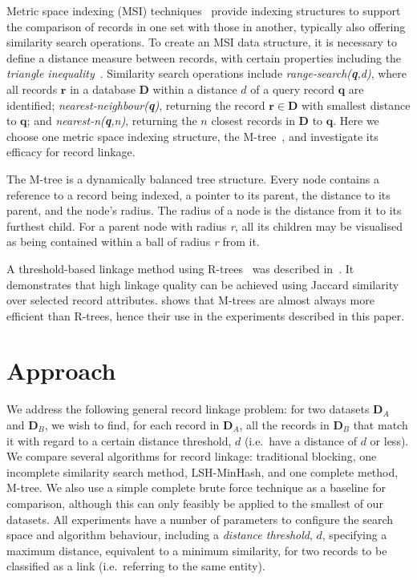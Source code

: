 \documentclass{llncs}
\begin{document}
Metric space indexing (MSI) techniques~\cite{Zezula2010} provide
indexing structures to support the comparison of records in one set
with those in another, typically also offering similarity search
operations. To create an MSI data structure, it is necessary to define
a distance measure between records, with certain properties including
the \emph{triangle inequality}~\cite{Zezula2010}. Similarity search
operations include \emph{range-search(\textbf{q},d)}, where all
records $\mathbf{r}$ in a database $\mathbf{D}$ within a distance $d$
of a query record $\mathbf{q}$ are identified;
\emph{nearest-neighbour(\textbf{q})}, returning the record $\mathbf{r}
\in \mathbf{D}$ with smallest distance to $\mathbf{q}$; and
\emph{nearest-n(\textbf{q},n)}, returning the $n$ closest records in
$\mathbf{D}$ to $\mathbf{q}$.
Here we choose one metric space indexing structure, the
M-tree~\cite{Ciaccia97indexingmetric}, and investigate its efficacy
for record linkage.

The M-tree is a dynamically balanced tree structure. Every node contains
a reference to a record being indexed, a pointer to its parent, the
distance to its parent, and the node's radius. The radius of a node is
the distance from it to its furthest child. For a parent node with
radius \textit{r}, all its children may be visualised as being contained
within a ball of radius \textit{r} from it.

A threshold-based linkage method using R-trees~\cite{Hjaltason1998}
was described in~\cite{Li2006}. It demonstrates that high linkage
quality can be achieved using Jaccard similarity over selected record
attributes. \cite{Ciaccia97indexingmetric} shows that M-trees are
almost always more efficient than R-trees, hence their use in the
experiments described in this paper.


\section{Approach}
\label{sec-approach}

We address the following general record linkage problem: for two
datasets $\mathbf{D}_A$ and $\mathbf{D}_B$, we wish to find, for each
record in $\mathbf{D}_A$, all the records in $\mathbf{D}_B$ that match
it with regard to a certain distance threshold, $d$ (i.e.\ have a
distance of $d$ or less). We compare several algorithms for record
linkage: traditional blocking, one incomplete similarity search method,
LSH-MinHash, and one complete method, M-tree. We also use a
simple complete brute force technique as a baseline for comparison,
although this can only feasibly be applied to the smallest of our
datasets. All experiments have a number of parameters to configure
the search space and algorithm behaviour, including a
\emph{distance threshold}, $d$, specifying a maximum distance,
equivalent to a minimum similarity, for two records to be classified
as a link (i.e.\ referring to the same entity).
\end{document}
